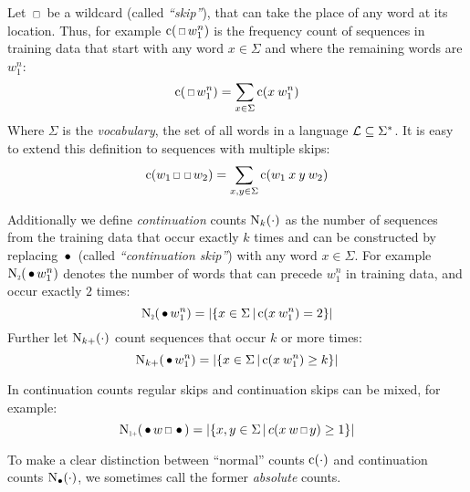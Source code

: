 Let $\Skp$ be a wildcard (called \emph{``skip''}), that can take the place
of any word at its location.
Thus, for example $\Count(\Skp w_1^n)$ is the frequency count of sequences
in training data that start with any word $x \in \Sigma$ and where the remaining
words are $w_1^n$:
\begin{equation}
  \Count(\Skp w_1^n) = \sum_{x \in \Sigma} \Count(x \: w_1^n)
\end{equation}
Where $\Sigma$ is the \emph{vocabulary}, the set of all words in a language
$\mathcal{L} \subseteq \Sigma^{*}$.
It is easy to extend this definition to sequences with multiple skips:
\begin{equation}
  \Count(w_1 \Skp \Skp w_2) = \sum_{x, y \in \Sigma} \Count(w_1 \: x \: y \: w_2)
\end{equation}


Additionally we define \emph{continuation} counts $\operatorname{N}_k(\cdot)$ as
the number of sequences from the training data that occur exactly $k$ times and
can be constructed by replacing $\,\bullet\,$ (called \emph{``continuation skip''})
with any word $x \in \Sigma$.
For example $\ContCountII(\WSkp w_1^n)$ denotes the number of words that can
precede $w_1^n$ in training data, and occur exactly $2$ times:
\begin{equation}
  \ContCountII(\WSkp w_1^n) =
    \Cardinality{\left\{ x \in \Sigma \,\middle|\, \Count(x \: w_1^n) = 2 \right\}}
\end{equation}
Further let $\operatorname{N}_{k+}(\cdot)$ count sequences that occur $k$ or more
times:
\begin{equation}
  \operatorname{N}_{k+}(\,\bullet\, w_1^n) =
    \left|\left\{ x \in \Sigma \,\middle|\, \operatorname{c}(x \: w_1^n) \geq k \right\}\right|
\end{equation}

In continuation counts regular skips and continuation skips can be mixed, for
example:
\begin{equation}
  \ContCountIp(\WSkp w \Skp \WSkp) =
    \Cardinality{\left\{ x, y \in \Sigma \,\middle|\, c(x \: w \Skp y) \geq 1 \right\}}
\end{equation}

To make a clear distinction between ``normal'' counts $\operatorname{c}(\cdot)$ and
continuation counts $\operatorname{N}_{\bullet}(\cdot)$, we
sometimes call the former \emph{absolute} counts.

